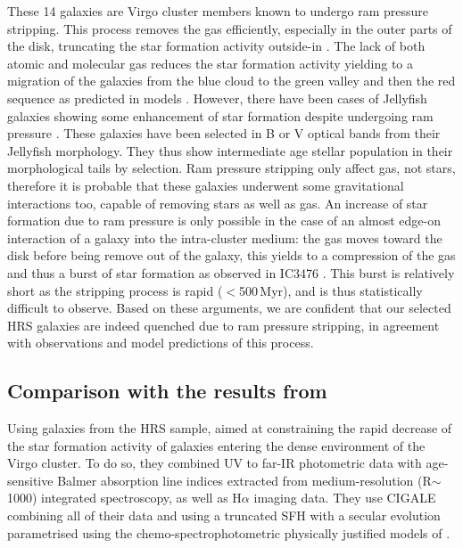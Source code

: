 \documentclass[traditabstract]{aa} %
\begin{document}
These 14 galaxies are Virgo cluster members known to undergo ram pressure stripping.
This process removes the gas efficiently, especially in the outer parts of the disk, truncating the star formation activity outside-in \citep{Boselli06,Boselli16}.
The lack of both atomic and molecular gas \citep{Fumagalli09,Boselli14} reduces the star formation activity yielding to a migration of the galaxies from the blue cloud to the green valley and then the red sequence as predicted in models \citep{Boselli06,Boselli16}.
However, there have been cases of Jellyfish galaxies showing some enhancement of star formation despite undergoing ram pressure \citep{Durret21}. 
These galaxies have been selected in B or V optical bands from their Jellyfish morphology.
They thus show intermediate age stellar population in their morphological tails by selection.
Ram pressure stripping only affect gas, not stars, therefore it is probable that these galaxies underwent some gravitational interactions too, capable of removing stars as well as gas.
An increase of star formation due to ram pressure is only possible in the case of an almost edge-on interaction of a galaxy into the intra-cluster medium: the gas moves toward the disk before being remove out of the galaxy, this yields to a compression of the gas and thus a burst of star formation as observed in IC3476 \citep{Boselli21}.
This burst is relatively short as the stripping process is rapid ($<$500\,Myr), and is thus statistically difficult to observe.
Based on these arguments, we are confident that our selected HRS galaxies are indeed quenched due to ram pressure stripping, in agreement with observations and model predictions of this process.


\subsection{Comparison with the results from \cite{Boselli16}}

Using galaxies from the HRS sample, \cite{Boselli16} aimed at constraining the rapid decrease of the star formation activity of galaxies entering the dense environment of the Virgo cluster.
To do so, they combined UV to far-IR photometric data with age-sensitive Balmer absorption line indices extracted from medium-resolution (R$\sim$1000) integrated spectroscopy, as well as H$\alpha$ imaging data.
They use CIGALE combining all of their data and using a truncated SFH with a secular evolution parametrised using the chemo-spectrophotometric physically justified models of \cite{BoissierPrantzos00}.
\end{document}
